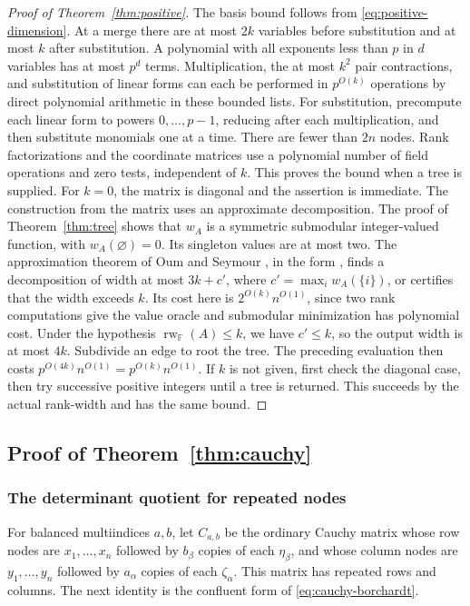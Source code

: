 \documentclass[11pt,reqno]{amsart}
\theoremstyle{remark}
\numberwithin{equation}{section}
\newcommand{\F}{\mathbb F}
\begin{document}
\begin{proof}[Proof of Theorem~\ref{thm:positive}]
The basis bound follows from \eqref{eq:positive-dimension}. At a merge there
are at most $2k$ variables before substitution and at most $k$
after substitution. A polynomial with all exponents less than $p$
in $d$ variables has at most $p^d$ terms. Multiplication, the
at most $k^2$ pair contractions, and substitution of linear forms
can each be performed in $p^{O(k)}$ operations by direct polynomial
arithmetic in these bounded lists. For substitution, precompute
each linear form to powers $0,\ldots,p-1$, reducing after each
multiplication, and then substitute monomials one at a time. There
are fewer than $2n$ nodes. Rank factorizations and the coordinate
matrices use a polynomial number of field operations and zero
tests, independent of $k$. This proves the bound when a tree is supplied. For $k=0$,
the matrix is diagonal and the assertion is immediate.
The construction from the matrix uses an approximate decomposition.
The proof of Theorem~\ref{thm:tree} shows that \(w_A\) is a
symmetric submodular integer-valued function, with \(w_A(\varnothing)=0\).
Its singleton values are at most two. The approximation theorem
of Oum and Seymour \cite{OumSeymour}, in the form
\cite[Theorem 5.3]{KorhonenOum}, finds a decomposition of width
at most \(3k+c'\), where \(c'=\max_i w_A(\{i\})\), or certifies
that the width exceeds \(k\). Its cost here is
\(2^{O(k)}n^{O(1)}\), since two rank computations give the
value oracle and submodular minimization has polynomial cost.
Under the hypothesis \(\operatorname{rw}_{\F}(A)\leq k\),
we have \(c'\leq k\), so the output width is at most \(4k\).
Subdivide an edge to root the tree. The preceding evaluation
then costs \(p^{O(4k)}n^{O(1)}=p^{O(k)}n^{O(1)}\).
If \(k\) is not given, first check the diagonal case, then
try successive positive integers until a tree is returned.
This succeeds by the actual rank-width and has the same bound.

\end{proof}

\subsection{Proof of Theorem~\ref{thm:cauchy}}


\subsubsection{The determinant quotient for repeated nodes}
For balanced multiindices $a,b$, let $C_{a,b}$ be the ordinary Cauchy matrix
whose row nodes are $x_1,\ldots,x_n$ followed by $b_\beta$ copies
of each $\eta_\beta$, and whose column nodes are $y_1,\ldots,y_n$
followed by $a_\alpha$ copies of each $\zeta_\alpha$.
This matrix has repeated rows and columns. The next identity is the
confluent form of \eqref{eq:cauchy-borchardt}.
\end{document}
